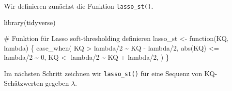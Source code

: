 \documentclass[
  a4paper,
  DIV=11,
  oneside]{scrreprt}
\newenvironment{Shaded}{\begin{snugshade}}{\end{snugshade}}
\newcommand{\CommentTok}[1]{\textcolor[rgb]{0.37,0.37,0.37}{#1}}
\newcommand{\ControlFlowTok}[1]{\textcolor[rgb]{0.00,0.23,0.31}{#1}}
\newcommand{\DecValTok}[1]{\textcolor[rgb]{0.68,0.00,0.00}{#1}}
\newcommand{\FunctionTok}[1]{\textcolor[rgb]{0.28,0.35,0.67}{#1}}
\newcommand{\NormalTok}[1]{\textcolor[rgb]{0.00,0.23,0.31}{#1}}
\newcommand{\OtherTok}[1]{\textcolor[rgb]{0.00,0.23,0.31}{#1}}
\newcommand{\SpecialCharTok}[1]{\textcolor[rgb]{0.37,0.37,0.37}{#1}}
\begin{document}
Wir definieren zunächst die Funktion \texttt{lasso\_st()}.

\begin{Shaded}
\begin{Highlighting}[]
\FunctionTok{library}\NormalTok{(tidyverse)}

\CommentTok{\# Funktion für Lasso soft{-}thresholding definieren}
\NormalTok{lasso\_st }\OtherTok{\textless{}{-}} \ControlFlowTok{function}\NormalTok{(KQ, lambda) \{}
  \FunctionTok{case\_when}\NormalTok{(}
\NormalTok{    KQ }\SpecialCharTok{\textgreater{}}\NormalTok{ lambda}\SpecialCharTok{/}\DecValTok{2}         \SpecialCharTok{\textasciitilde{}}\NormalTok{ KQ }\SpecialCharTok{{-}}\NormalTok{ lambda}\SpecialCharTok{/}\DecValTok{2}\NormalTok{,}
    \FunctionTok{abs}\NormalTok{(KQ) }\SpecialCharTok{\textless{}=}\NormalTok{ lambda}\SpecialCharTok{/}\DecValTok{2}   \SpecialCharTok{\textasciitilde{}} \DecValTok{0}\NormalTok{,}
\NormalTok{    KQ }\SpecialCharTok{\textless{}} \SpecialCharTok{{-}}\NormalTok{lambda}\SpecialCharTok{/}\DecValTok{2}        \SpecialCharTok{\textasciitilde{}}\NormalTok{ KQ }\SpecialCharTok{+}\NormalTok{ lambda}\SpecialCharTok{/}\DecValTok{2}\NormalTok{,}
\NormalTok{  )}
\NormalTok{\}}
\end{Highlighting}
\end{Shaded}

Im nächsten Schritt zeichnen wir \texttt{lasso\_st()} für eine Sequenz
von KQ-Schätzwerten gegeben \(\lambda\).
\end{document}
